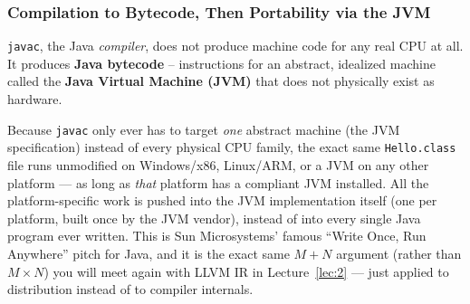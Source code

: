 \documentclass[full-course-notes.tex]{subfiles}
\begin{document}
\subsubsection{Compilation to Bytecode, Then Portability via the JVM}

\dbtag \texttt{javac}, the Java \emph{compiler}, does not produce machine code for any real CPU
at all. It produces \textbf{Java bytecode} -- instructions for an abstract, idealized machine
called the \textbf{Java Virtual Machine (JVM)} that does not physically exist as hardware.

\begin{center}
\end{center}

\begin{coreidea}
Because \texttt{javac} only ever has to target \emph{one} abstract machine (the JVM
specification) instead of every physical CPU family, the exact same \texttt{Hello.class} file
runs unmodified on Windows/x86, Linux/ARM, or a JVM on any other platform --- as long as
\emph{that} platform has a compliant JVM installed. All the platform-specific work is pushed
into the JVM implementation itself (one per platform, built once by the JVM vendor), instead of
into every single Java program ever written. This is Sun Microsystems' famous ``Write Once, Run
Anywhere'' pitch for Java, and it is the exact same $M + N$ argument (rather than $M \times N$)
you will meet again with LLVM IR in Lecture~\ref{lec:2} --- just applied to distribution instead
of to compiler internals.
\end{coreidea}
\end{document}
